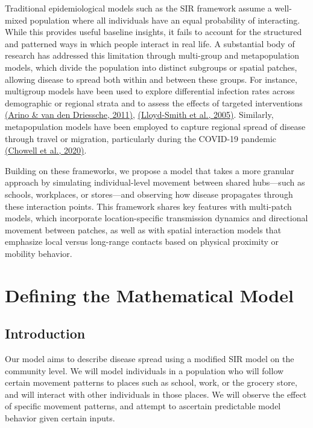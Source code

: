 \documentclass[12pt]{article}
\begin{document}
Traditional epidemiological models such as the SIR framework assume a well-mixed population where all individuals have an equal probability of interacting. While this provides useful baseline insights, it fails to account for the structured and patterned ways in which people interact in real life. A substantial body of research has addressed this limitation through multi-group and metapopulation models, which divide the population into distinct subgroups or spatial patches, allowing disease to spread both within and between these groups. For instance, multigroup models have been used to explore differential infection rates across demographic or regional strata and to assess the effects of targeted interventions \href{https://www.sciencedirect.com/science/article/abs/pii/S0022519311004760}{(Arino \& van den Driessche, 2011)}, \href{https://pmc.ncbi.nlm.nih.gov/articles/PMC9698251}{(Lloyd-Smith et al., 2005)}. Similarly, metapopulation models have been employed to capture regional spread of disease through travel or migration, particularly during the COVID-19 pandemic \href{https://www.frontiersin.org/journals/physics/articles/10.3389/fphy.2020.00261/full}{(Chowell et al., 2020)}.

Building on these frameworks, we propose a model that takes a more granular approach by simulating individual-level movement between shared hubs—such as schools, workplaces, or stores—and observing how disease propagates through these interaction points. This framework shares key features with multi-patch models, which incorporate location-specific transmission dynamics and directional movement between patches, as well as with spatial interaction models that emphasize local versus long-range contacts based on physical proximity or mobility behavior.



\section{Defining the Mathematical Model}
\subsection{Introduction}
Our model aims to describe disease spread using a modified SIR model on the community level. We will model individuals in a population who will follow certain movement patterns to places such as school, work, or the grocery store, and will interact with other individuals in those places. We will observe the effect of specific movement patterns, and attempt to ascertain predictable model behavior given certain inputs.
\end{document}
